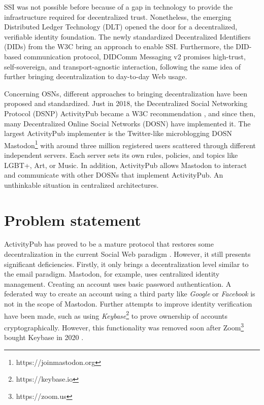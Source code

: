 SSI was not possible before because of a gap in technology to provide the infrastructure required for decentralized trust. Nonetheless, the emerging Distributed Ledger Technology (DLT) opened the door for a decentralized, verifiable identity foundation. The newly standardized Decentralized Identifiers (DIDs) from the W3C bring an approach to enable SSI. Furthermore, the DID-based communication protocol, DIDComm Messaging v2 promises high-trust, self-sovereign, and transport-agnostic interaction, following the same idea of further bringing decentralization to day-to-day Web usage.

Concerning OSNs, different approaches to bringing decentralization have been proposed and standardized. Just in 2018, the Decentralized Social Networking Protocol (DSNP) ActivityPub became a W3C recommendation \cite{lemmer-webber_tallon_guy_prodromou_2018}, and since then, many Decentralized Online Social Networks (DOSN) have implemented it. The largest ActivityPub implementer is the Twitter-like microblogging DOSN Mastodon\footnote{https://joinmastodon.org} with around three million registered users scattered through different independent servers. Each server sets its own rules, policies, and topics like LGBT+, Art, or Music. In addition, ActivityPub allows Mastodon to interact and communicate with other DOSNs that implement ActivityPub. An unthinkable situation in centralized architectures. 


\section{Problem statement}
 
 ActivityPub has proved to be a mature protocol that restores some decentralization in the current Social Web paradigm \cite{webber_sporny_2017}.  However, it still presents significant deficiencies. Firstly, it only brings a decentralization level similar to the email paradigm. Mastodon, for example, uses centralized identity management. Creating an account uses basic password authentication. A federated way to create an account using a third party like \emph{Google} or \emph{Facebook} is not in the scope of Mastodon. Further attempts to improve identity verification have been made, such as using \emph{Keybase}\footnote{https://keybase.io} to prove ownership of accounts cryptographically. However, this functionality was removed soon after Zoom\footnote{https://zoom.us} bought Keybase in 2020 \cite{rochko_2021}. 

